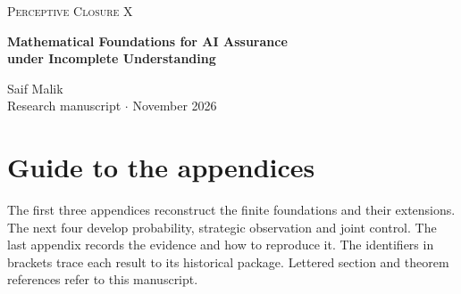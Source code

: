 \documentclass[11pt]{article}
\newcommand{\paperauthor}{Saif Malik}
\theoremstyle{definition}
\begin{document}
\begin{center}
{\large\scshape Perceptive Closure X}\\[0.45em]
{\LARGE\bfseries\color{ink} Mathematical Foundations for AI Assurance\\[3pt] under Incomplete Understanding\par}
\vspace{0.25em}
{\normalsize\paperauthor}\\[0.1em]
{\small Research manuscript \quad$\cdot$ November 2026}
\end{center}
\begin{abstract}
How much must we understand about an AI system to justify a particular deployment decision? An evaluation can leave several explanations of the system's behavior open. If all give the same answer to the deployment question, the answer is identified. Acting on it requires a further step: one policy must deliver the promised service using only the observations and permissions available to it. We study these two requirements together. We characterize which trusted source checks settle a question, how much they cost, and which facts connect an evaluation to physical outcomes after a system learns its verdict. On one governed service, a single read settles feasibility while exact installation identification requires exponentially many point queries. For linked stochastic and strategic models we give exact synthesis results and, under verified approximation bounds, a certificate for the price of an implementable policy. Seventeen experimental packages examine the mechanisms and their limits. In prospective constructed services, useful work could supply a missing observation without a separate paid audit, and two separately implemented runs supported the declared risk bound among issued decisions. Some sharper comparisons remained inconclusive. Applying these results to a deployment requires independent evidence for its model, permissions and physical outcomes.
\end{abstract}











\clearpage


\clearpage
\appendix
\section*{Guide to the appendices}
The first three appendices reconstruct the finite foundations and their extensions. The next four develop probability, strategic observation and joint control. The last appendix records the evidence and how to reproduce it. The identifiers in brackets trace each result to its historical package. Lettered section and theorem references refer to this manuscript.
\tableofcontents
\clearpage

\clearpage
\clearpage
\clearpage
\clearpage
\clearpage
\clearpage
\clearpage
\end{document}
